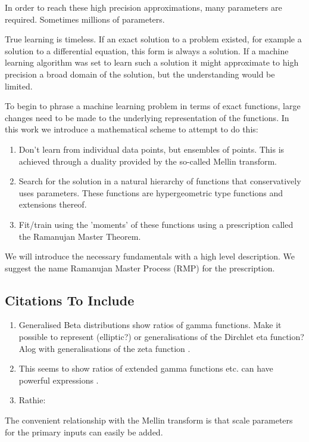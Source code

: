 \documentclass[journal=jcisd8,manuscript=article,layout=onecolumn,pdftex,floatfix,amsmath,amssymb,10pt]{achemso}
\begin{document}
In order to reach these high precision approximations, many parameters are required. Sometimes millions of parameters.

True learning is timeless. If an exact solution to a problem existed, for example a solution to a differential equation, this form is always a solution. If a machine learning algorithm was set to learn such a solution it might approximate to high precision a broad domain of the solution, but the understanding would be limited.

To begin to phrase a machine learning problem in terms of exact functions, large changes need to be made to the underlying representation of the functions. In this work we introduce a mathematical scheme to attempt to do this: 

\begin{enumerate}
\item Don't learn from individual data points, but ensembles of points. This is achieved through a duality provided by the so-called Mellin transform.
\item Search for the solution in a natural hierarchy of functions that conservatively uses parameters. These functions are hypergeometric type functions and extensions thereof. 
\item Fit/train using the 'moments' of these functions using a prescription called the Ramanujan Master Theorem.
\end{enumerate}

We will introduce the necessary fundamentals with a high level description. We suggest the name Ramanujan Master Process (RMP) for the prescription.








\subsection{Citations To Include}
\begin{enumerate}
\item Generalised Beta distributions show ratios of gamma functions. Make it possible to represent (elliptic?) or generalisations of the Dirchlet eta function? Alog with generalisations of the zeta function \cite{ostrovsky2013theory}.
\item This seems to show ratios of extended gamma functions etc. can have powerful expressions \cite{Luo2013}.
\item Rathie: %
\end{enumerate}
The convenient relationship with the Mellin transform is that scale parameters for the primary inputs can easily be added.
\end{document}
